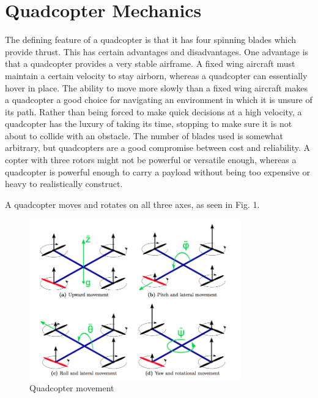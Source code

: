 \documentclass[11pt]{article} %
\begin{document}
\section{Quadcopter Mechanics}

The defining feature of a quadcopter is that it has four spinning blades which provide thrust. This has certain advantages and disadvantages. One advantage is that a quadcopter provides a very stable airframe. A fixed wing aircraft must maintain a certain velocity to stay airborn, whereas a quadcopter can essentially hover in place. The ability to move more slowly than a fixed wing aircraft makes a quadcopter a good choice for navigating an environment in which it is unsure of its path. Rather than being forced to make quick decisions at a high velocity, a quadcopter has the luxury of taking its time, stopping to make sure it is not about to collide with an obstacle. The number of blades used is somewhat arbitrary, but quadcopters are a good compromise between cost and reliability. A copter with three rotors might not be powerful or versatile enough, whereas a quadcopter is powerful enough to carry a payload without being too expensive or heavy to realistically construct.

A quadcopter moves and rotates on all three axes, as seen in Fig. 1.

\begin{figure}[h!]
	\centering
  \includegraphics[width=345px]{quadcopter_movement.png}
  \caption{Quadcopter movement}
  \label{fig:}
\end{figure} 
\end{document}
